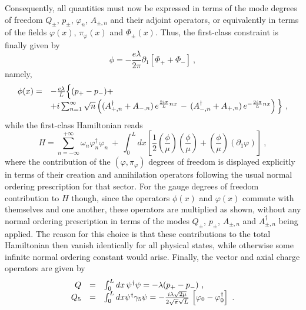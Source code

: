 \documentclass[a4paper,11pt]{article}
\begin{document}
Consequently, all quantities must now be expressed in terms of the mode 
degrees of freedom $Q_\pm$, $p_\pm$, $\varphi_n$, $A_{\pm,n}$ and their
adjoint operators, or equi\-va\-lent\-ly in terms of the fields $\varphi(x)$,
$\pi_\varphi(x)$ and $\Phi_\pm(x)$. Thus, the first-class constraint is 
finally given by
\begin{equation}
\phi=-\frac{e\lambda}{2\pi}\partial_1\left[\Phi_+ + \Phi_-\right]\ ,
\end{equation}
namely,
\begin{equation}
\begin{array}{r l}
\phi(x)=&-\frac{e\lambda}{L}\Big\{(p_+-p_-)+\\
& +i\sum_{n=1}^\infty\sqrt{n}\left((A^\dagger_{+,n}+A_{-,n})\,
e^{\frac{2i\pi}{L}nx}\,-\,(A^\dagger_{-,n}+A_{+,n})\,
e^{-\frac{2i\pi}{L}nx}\right)\Big\}\ ,
\end{array}
\label{eq:opphi}
\end{equation}
while the first-class Hamiltonian reads
\begin{equation}
H=\sum_{n=-\infty}^{+\infty} \omega_n\varphi^\dagger_n\varphi_n\ +\
\int_0^L dx \left[\frac{1}{2}
\left(\frac{\phi}{\mu}\right)\left(\frac{\phi}{\mu}\right)+
\left(\frac{\phi}{\mu}\right)(\partial_1\varphi)\right]\ ,
\label{eq:opH}
\end{equation}
where the contribution of the $(\varphi,\pi_\varphi)$ degrees of freedom is 
displayed ex\-pli\-ci\-tly in terms of their creation and annihilation
operators following the usual normal ordering prescription for that sector.
For the gauge degrees of freedom contribution to $H$ though, since 
the operators $\phi(x)$ and $\varphi(x)$ commute with themselves and one 
another, these operators are multiplied as shown, without any normal
ordering prescription in terms of the modes $Q_\pm$, $p_\pm$, $A_{\pm,n}$
and $A^\dagger_{\pm,n}$ being applied. The reason for this choice is
that these contributions to the total Hamiltonian then vanish identically
for all physical states, while otherwise some infinite normal ordering
constant would arise. Finally, the vector and axial charge operators 
are given by
\begin{equation}
\begin{array}{r c l}
Q&=&\int_0^L dx\,\psi^\dagger\psi=-\lambda(p_+-p_-)\ ,\\
Q_5&=&\int_0^L dx\psi^\dagger\gamma_5\psi=
-\frac{i\lambda\sqrt{2\mu}}{2\sqrt{\pi}\sqrt{L}}\,
\left[\varphi_0-\varphi^\dagger_0\right]\ .
\end{array}
\label{eq:opQ}
\end{equation}
\end{document}
